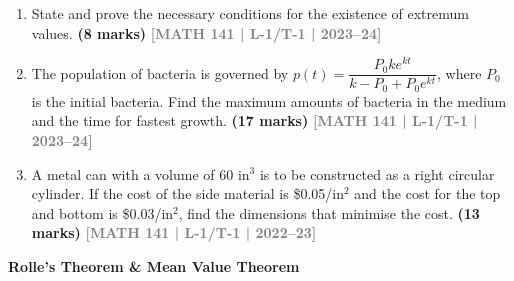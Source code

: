 \documentclass[12pt,a4paper]{article}
\newcommand{\yr}[1]{\hfill\textcolor{gray}{\small\textbf{[#1]}}}
\newcommand{\mk}[1]{\textcolor{orange!70!black}{\small\textbf{(#1 marks)}}}
\newcommand{\subtopic}[2]{%
  \vspace{10pt}
  \noindent\begin{tcolorbox}[colback=#1!8,colframe=#1,boxrule=0.6pt,arc=4pt,
    left=6pt,right=6pt,top=4pt,bottom=4pt]
    \small\bfseries\textcolor{#1}{#2}
  \end{tcolorbox}
  \vspace{2pt}
}
\begin{document}
\begin{enumerate}
\item State and prove the necessary conditions for the existence of extremum values.
\mk{8} \yr{MATH 141 | L-1/T-1 | 2023--24}

\item The population of bacteria is governed by $p(t)=\dfrac{P_{0}ke^{kt}}{k-P_{0}+P_{0}e^{kt}}$, where $P_{0}$ is the initial bacteria. Find the maximum amounts of bacteria in the medium and the time for fastest growth.
\mk{17} \yr{MATH 141 | L-1/T-1 | 2023--24}

\item A metal can with a volume of 60 in$^{3}$ is to be constructed as a right circular cylinder. If the cost of the side material is \$0.05/in$^{2}$ and the cost for the top and bottom is \$0.03/in$^{2}$, find the dimensions that minimise the cost.
\mk{13} \yr{MATH 141 | L-1/T-1 | 2022--23}



\end{enumerate}

\subtopic{cA}{Rolle's Theorem \& Mean Value Theorem}
\label{sub:s1-rolle}
\end{document}
